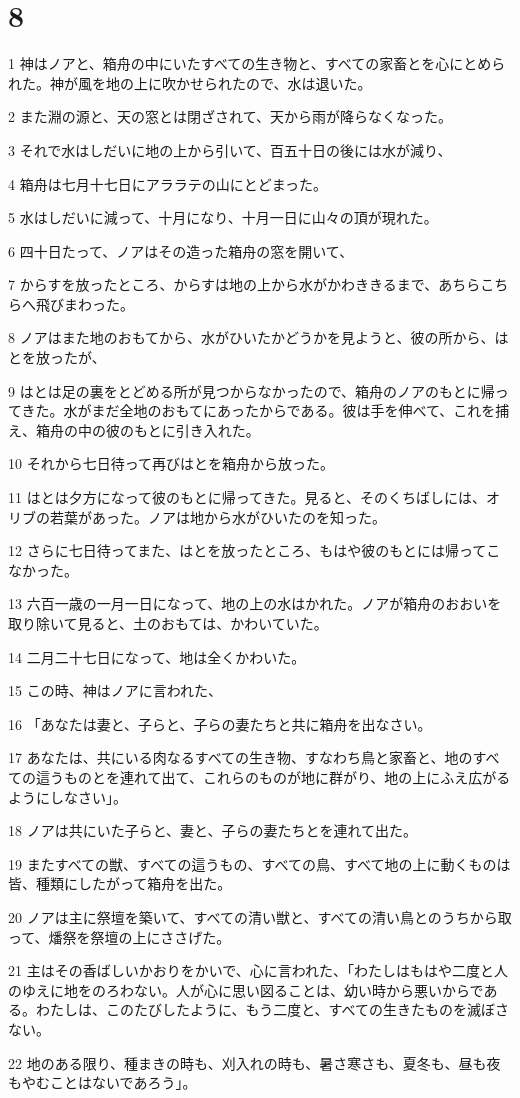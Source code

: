 \chapter{8}

\par 1 神はノアと、箱舟の中にいたすべての生き物と、すべての家畜とを心にとめられた。神が風を地の上に吹かせられたので、水は退いた。
\par 2 また淵の源と、天の窓とは閉ざされて、天から雨が降らなくなった。
\par 3 それで水はしだいに地の上から引いて、百五十日の後には水が減り、
\par 4 箱舟は七月十七日にアララテの山にとどまった。
\par 5 水はしだいに減って、十月になり、十月一日に山々の頂が現れた。
\par 6 四十日たって、ノアはその造った箱舟の窓を開いて、
\par 7 からすを放ったところ、からすは地の上から水がかわききるまで、あちらこちらへ飛びまわった。
\par 8 ノアはまた地のおもてから、水がひいたかどうかを見ようと、彼の所から、はとを放ったが、
\par 9 はとは足の裏をとどめる所が見つからなかったので、箱舟のノアのもとに帰ってきた。水がまだ全地のおもてにあったからである。彼は手を伸べて、これを捕え、箱舟の中の彼のもとに引き入れた。
\par 10 それから七日待って再びはとを箱舟から放った。
\par 11 はとは夕方になって彼のもとに帰ってきた。見ると、そのくちばしには、オリブの若葉があった。ノアは地から水がひいたのを知った。
\par 12 さらに七日待ってまた、はとを放ったところ、もはや彼のもとには帰ってこなかった。
\par 13 六百一歳の一月一日になって、地の上の水はかれた。ノアが箱舟のおおいを取り除いて見ると、土のおもては、かわいていた。
\par 14 二月二十七日になって、地は全くかわいた。
\par 15 この時、神はノアに言われた、
\par 16 「あなたは妻と、子らと、子らの妻たちと共に箱舟を出なさい。
\par 17 あなたは、共にいる肉なるすべての生き物、すなわち鳥と家畜と、地のすべての這うものとを連れて出て、これらのものが地に群がり、地の上にふえ広がるようにしなさい」。
\par 18 ノアは共にいた子らと、妻と、子らの妻たちとを連れて出た。
\par 19 またすべての獣、すべての這うもの、すべての鳥、すべて地の上に動くものは皆、種類にしたがって箱舟を出た。
\par 20 ノアは主に祭壇を築いて、すべての清い獣と、すべての清い鳥とのうちから取って、燔祭を祭壇の上にささげた。
\par 21 主はその香ばしいかおりをかいで、心に言われた、「わたしはもはや二度と人のゆえに地をのろわない。人が心に思い図ることは、幼い時から悪いからである。わたしは、このたびしたように、もう二度と、すべての生きたものを滅ぼさない。
\par 22 地のある限り、種まきの時も、刈入れの時も、暑さ寒さも、夏冬も、昼も夜もやむことはないであろう」。

